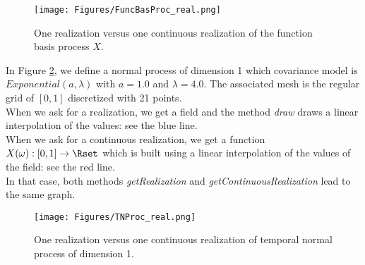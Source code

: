              \begin{figure}[H]
               \begin{center}
                 \texttt{[image: Figures/FuncBasProc\_real.png]}
                 \caption{One realization versus one continuous realization of the function basis process $X$.}
                 \label{FBP}
               \end{center}
             \end{figure}


             In Figure \ref{TGP}, we define a normal process of dimension 1 which covariance model is $Exponential(a,\lambda)$ with $a=1.0$ and $\lambda=4.0$. The associated mesh is the regular grid of $[0,1]$ discretized with 21 points.\\
             When we ask for a realization, we get a field and the method \textit{draw} draws a linear interpolation of the values: see the blue line.\\
             When we ask for a continuous realization, we get a function $X(\omega): [0,1] \rightarrow \Rset$ which is built using a linear interpolation of the values of the field: see the red line. \\
             In that case, both methods \emph{getRealization} and \emph{getContinuousRealization} lead to the same graph.


             \begin{figure}[H]
               \begin{center}
                 \texttt{[image: Figures/TNProc\_real.png]}
                 \caption{One realization versus one continuous realization of temporal normal process of dimension 1.}
                 \label{TGP}
               \end{center}
             \end{figure}
